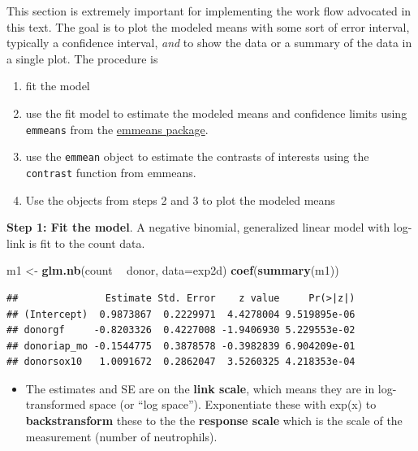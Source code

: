 \documentclass[]{book}
\newenvironment{Shaded}{\begin{snugshade}}{\end{snugshade}}
\newcommand{\DataTypeTok}[1]{\textcolor[rgb]{0.13,0.29,0.53}{#1}}
\newcommand{\KeywordTok}[1]{\textcolor[rgb]{0.13,0.29,0.53}{\textbf{#1}}}
\newcommand{\NormalTok}[1]{#1}
\newcommand{\OperatorTok}[1]{\textcolor[rgb]{0.81,0.36,0.00}{\textbf{#1}}}
\newcommand{\StringTok}[1]{\textcolor[rgb]{0.31,0.60,0.02}{#1}}
\providecommand{\tightlist}{%
  \setlength{\itemsep}{0pt}\setlength{\parskip}{0pt}}
\begin{document}
This section is extremely important for implementing the work flow advocated in this text. The goal is to plot the modeled means with some sort of error interval, typically a confidence interval, \emph{and} to show the data or a summary of the data in a single plot. The procedure is

\begin{enumerate}
\def\labelenumi{\arabic{enumi}.}
\tightlist
\item
  fit the model
\item
  use the fit model to estimate the modeled means and confidence limits using \texttt{emmeans} from the \href{https://cran.r-project.org/web/packages/emmeans/index.html}{emmeans package}.
\item
  use the \texttt{emmean} object to estimate the contrasts of interests using the \texttt{contrast} function from emmeans.
\item
  Use the objects from steps 2 and 3 to plot the modeled means
\end{enumerate}

\textbf{Step 1: Fit the model}. A negative binomial, generalized linear model with log-link is fit to the count data.

\begin{Shaded}
\begin{Highlighting}[]
\NormalTok{m1 <-}\StringTok{ }\KeywordTok{glm.nb}\NormalTok{(count }\OperatorTok{~}\StringTok{ }\NormalTok{donor, }\DataTypeTok{data=}\NormalTok{exp2d)}
\KeywordTok{coef}\NormalTok{(}\KeywordTok{summary}\NormalTok{(m1))}
\end{Highlighting}
\end{Shaded}

\begin{verbatim}
##               Estimate Std. Error    z value     Pr(>|z|)
## (Intercept)  0.9873867  0.2229971  4.4278004 9.519895e-06
## donorgf     -0.8203326  0.4227008 -1.9406930 5.229553e-02
## donoriap_mo -0.1544775  0.3878578 -0.3982839 6.904209e-01
## donorsox10   1.0091672  0.2862047  3.5260325 4.218353e-04
\end{verbatim}

\begin{itemize}
\tightlist
\item
  The estimates and SE are on the \textbf{link scale}, which means they are in log-transformed space (or ``log space''). Exponentiate these with exp(x) to \textbf{backstransform} these to the the \textbf{response scale} which is the scale of the measurement (number of neutrophils).
\end{itemize}
\end{document}

